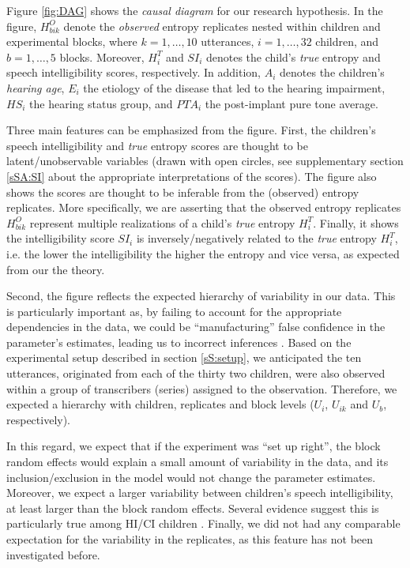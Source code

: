 Figure \ref{fig:DAG} shows the \textit{causal diagram} for our research hypothesis. In the figure, $H^{O}_{bik}$ denote the \textit{observed} entropy replicates nested within children and experimental blocks, where $k=1,\dots,10$ utterances, $i=1,\dots,32$ children, and $b=1,\dots,5$ blocks. Moreover, $H^{T}_{i}$ and $SI_{i}$ denotes the child's \textit{true} entropy and speech intelligibility scores, respectively. In addition, $A_{i}$ denotes the children's \textit{hearing age}, $E_{i}$ the etiology of the disease that led to the hearing impairment, $HS_{i}$ the hearing status group, and $PTA_{i}$ the post-implant pure tone average.

Three main features can be emphasized from the figure. First, the children's speech intelligibility and \textit{true} entropy scores are thought to be latent/unobservable variables \cite{Everitt_1984} (drawn with open circles, see supplementary section \ref{sSA:SI} about the appropriate interpretations of the scores). The figure also shows the scores are thought to be inferable from the (observed) entropy replicates. More specifically, we are asserting that the observed entropy replicates $H^{O}_{bik}$ represent multiple realizations of a child's \textit{true} entropy $H^{T}_{i}$. Finally, it shows the intelligibility score $SI_{i}$ is inversely/negatively related to the \textit{true} entropy $H^{T}_{i}$, i.e. the lower the intelligibility the higher the entropy and vice versa, as expected from our the theory. 

Second, the figure reflects the expected hierarchy of variability in our data. This is particularly important as, by failing to account for the appropriate dependencies in the data, we could be ``manufacturing'' false confidence in the parameter's estimates, leading us to incorrect inferences \cite{McElreath_2020}. Based on the experimental setup described in section \ref{sS:setup}, we anticipated the ten utterances, originated from each of the thirty two children, were also observed within a group of transcribers (series) assigned to the observation. Therefore, we expected a hierarchy with children, replicates and block levels ($U_{i}$, $U_{ik}$ and $U_{b}$, respectively).

In this regard, we expect that if the experiment was ``set up right'', the block random effects would explain a small amount of variability in the data, and its inclusion/exclusion in the model would not change the parameter estimates. Moreover, we expect a larger variability between children's speech intelligibility, at least larger than the block random effects. Several evidence suggest this is particularly true among HI/CI children \cite{Young_et_al_2002, Peng_et_al_2004, Montag_et_al_2014, Castellanos_et_al_2014, Yanbay_et_al_2014, Nittrouer_et_al_2014, Freeman_et_al_2017}. Finally, we did not had any comparable expectation for the variability in the replicates, as this feature has not been investigated before.

